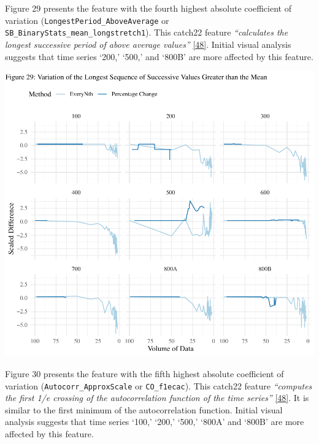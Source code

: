 \documentclass{article}
\begin{document}
\newpage

Figure 29 presents the feature with the fourth highest absolute
coefficient of variation (\texttt{LongestPeriod\_AboveAverage} or
\texttt{SB\_BinaryStats\_mean\_longstretch1}). This catch22 feature
\emph{``calculates the longest successive period of above average
values''} \protect\hyperlink{ref-feature_book}{{[}48{]}}. Initial visual
analysis suggests that time series `200,' `500,' and `800B' are more
affected by this feature.

\includegraphics{210431461_CSC8639_Dissertation_files/figure-latex/LongestGreater-1.pdf}

\newpage

Figure 30 presents the feature with the fifth highest absolute
coefficient of variation (\texttt{Autocorr\_ApproxScale} or
\texttt{CO\_f1ecac}). This catch22 feature \emph{``computes the first
1/e crossing of the autocorrelation function of the time series''}
\protect\hyperlink{ref-feature_book}{{[}48{]}}. It is similar to the
first minimum of the autocorrelation function. Initial visual analysis
suggests that time series `100,' `200,' `500,' `800A' and `800B' are
more affected by this feature.
\end{document}
